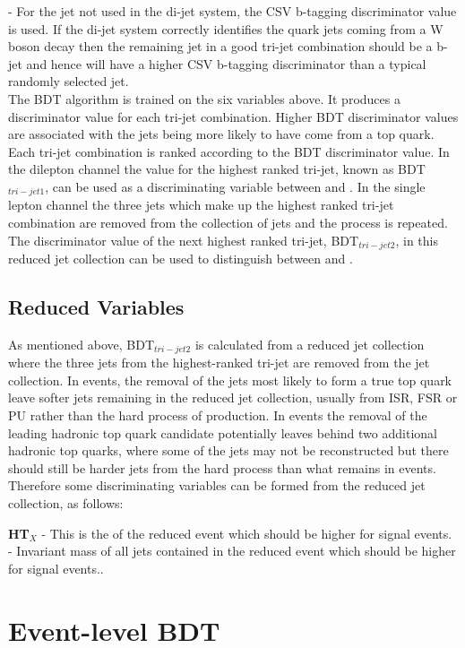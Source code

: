 \textbf{\CSVj} - For the jet not used in the di-jet system, the CSV b-tagging discriminator value is used. If the di-jet system correctly identifies the quark jets coming from a W boson decay then the remaining jet in a good tri-jet combination should be a b-jet and hence will have a higher CSV b-tagging discriminator than a typical randomly selected jet.\\
The BDT algorithm is trained on the six variables above. It produces a discriminator value for each tri-jet combination. Higher BDT discriminator values are associated with the jets being more likely to have come from a top quark. Each tri-jet combination is ranked according to the BDT discriminator value. In the dilepton channel the value for the highest ranked tri-jet, known as BDT$_{tri-jet1}$, can be used as a discriminating variable between \tttt and \ttbar. In the single lepton channel the three jets which make up the highest ranked tri-jet combination are removed from the collection of jets and the process is repeated. The discriminator value of the next highest ranked tri-jet, BDT$_{tri-jet2}$, in this reduced jet collection can be used to distinguish between \tttt and \ttbar.

\subsection{Reduced Variables}
As mentioned above, BDT$_{tri-jet2}$ is calculated from a reduced jet collection where the three jets from the highest-ranked tri-jet are removed from the jet collection. In \ttbar events, the removal of the jets most likely to form a true top quark leave softer jets remaining in the reduced jet collection, usually from ISR, FSR or PU rather than the hard process of \ttbar production. In \tttt events the removal of the leading hadronic top quark candidate potentially leaves behind two additional hadronic top quarks, where some of the jets may not be reconstructed but there should still be harder jets from the hard process than what remains in \ttbar events. Therefore some discriminating variables can be formed from the reduced jet collection, as follows:

\textbf{HT$_{X}$} - This is the \HT of the reduced event which should be higher for signal \tttt events.\\
\textbf{\sumjetmassX} - Invariant mass of all jets contained in the reduced event which should be higher for signal \tttt events..

\section{Event-level BDT}

